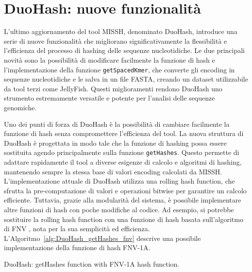 \section{DuoHash: nuove funzionalità}
\label{sec:DuoHash-newFunctionality}

L'ultimo aggiornamento del tool MISSH, denominato DuoHash, introduce una serie di nuove funzionalità che migliorano significativamente la flessibilità e l'efficienza del processo di hashing delle sequenze nucleotidiche. Le due principali novità sono la possibilità di modificare facilmente la funzione di hash e l'implementazione della funzione \verb|getSpacedKmer|, che converte gli encoding in sequenze nucleotidiche e le salva in un file FASTA, creando un dataset utilizzabile da tool terzi come JellyFish. Questi miglioramenti rendono DuoHash uno strumento estremamente versatile e potente per l'analisi delle sequenze genomiche.

Uno dei punti di forza di DuoHash è la possibilità di cambiare facilmente la funzione di hash senza compromettere l'efficienza del tool. La nuova struttura di DuoHash è progettata in modo tale che la funzione di hashing possa essere sostituita agendo principalmente sulla funzione \verb|getHashes|. Questo permette di adattare rapidamente il tool a diverse esigenze di calcolo e algoritmi di hashing, mantenendo sempre la stessa base di valori encoding calcolati da \acs{MISSH}. L'implementazione attuale di DuoHash utilizza una rolling hash function, che sfrutta la pre-computazione di valori e operazioni bitwise per garantire un calcolo efficiente. Tuttavia, grazie alla modularità del sistema, è possibile implementare altre funzioni di hash con poche modifiche al codice. Ad esempio, si potrebbe sostituire la rolling hash function con una funzione di hash basata sull'algoritmo di \ac{FNV} \cite{fowler2005fnv}, nota per la sua semplicità ed efficienza. L'Algoritmo~\ref{alg:DuoHash_getHashes_fnv} descrive una possibile implementazione della funzione di hash \acs{FNV}-1A.

\begin{algorithm}[!ht]
	\caption{DuoHash: getHashes function with \acs{FNV}-1A hash function.}
	\label{alg:DuoHash_getHashes_fnv}
	
\end{algorithm}

